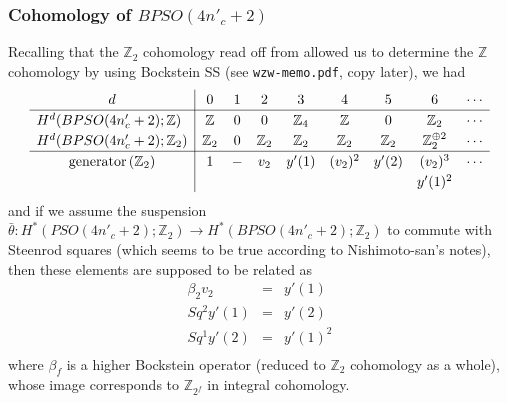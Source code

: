 \documentclass[12pt]{article}
\numberwithin{equation}{section}
\def\bZ{\mathbb{Z}}
\begin{document}
\subsubsection{Cohomology of $BPSO(4n'_c+2)$}
Recalling that the $\bZ_2$ cohomology read off from \cite{KonoMimura1974}
allowed us to determine the $\bZ$ cohomology by using Bockstein SS
(see \texttt{wzw-memo.pdf}, copy later), we had
\begin{equation}
	\renewcommand{\arraystretch}{1.2}
	\begin{array}{c|cccccccccccccccc}
		d & 0 & 1 & 2 & 3 & 4 & 5 & 6 & \cdots \\
		\hline
		\multicolumn{1}{l|}{H^d(BPSO(4n'_c+2);\bZ)} & \bZ & 0 & 0 & \bZ_4 & \bZ & 0 & \bZ_2 & \cdots\\
		\multicolumn{1}{l|}{H^d(BPSO(4n'_c+2);\bZ_2)} & \bZ_2 & 0 & \bZ_2 & \bZ_2 & \bZ_2 & \bZ_2 & \bZ_2^{\oplus 2} & \cdots\\
		\hline
		\text{generator} \,(\bZ_2) & 1 & - & v_2 & y'(1) & (v_2)^2 & y'(2) & (v_2)^3 & \cdots\\
		&&&&&&& y'(1)^2\\
	\end{array}
\end{equation}
and if we assume the suspension $\bar\theta: H^\ast(PSO(4n'_c+2);\bZ_2) \to H^\ast(BPSO(4n'_c+2);\bZ_2)$
to commute with Steenrod squares (which seems to be true according to Nishimoto-san's notes),
then these elements are supposed to be related as
\begin{equation*}
	\begin{array}{ccl}
		\beta_2 v_2 & = & y'(1)\\
		Sq^2 y'(1) & = & y'(2)\\
		Sq^1 y'(2) & = & y'(1)^2\\
	\end{array}
\end{equation*}
where $\beta_f$ is a higher Bockstein operator (reduced to $\bZ_2$ cohomology as a whole),
whose image corresponds to $\bZ_{2^f}$ in integral cohomology.
\end{document}
